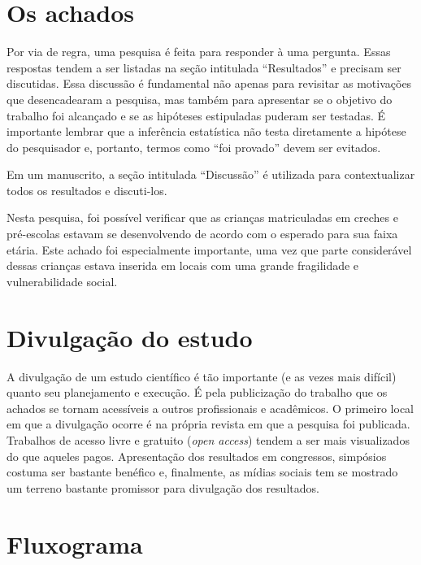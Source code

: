 \documentclass[
]{book}
\begin{document}
\hypertarget{os-achados}{%
\section{Os achados}\label{os-achados}}

Por via de regra, uma pesquisa é feita para responder à uma pergunta. Essas respostas tendem a ser listadas na seção intitulada ``Resultados'' e precisam ser discutidas. Essa discussão é fundamental não apenas para revisitar as motivações que desencadearam a pesquisa, mas também para apresentar se o objetivo do trabalho foi alcançado e se as hipóteses estipuladas puderam ser testadas. É importante lembrar que a inferência estatística não testa diretamente a hipótese do pesquisador e, portanto, termos como ``foi provado'' devem ser evitados.

Em um manuscrito, a seção intitulada ``Discussão'' é utilizada para contextualizar todos os resultados e discuti-los.

Nesta pesquisa, foi possível verificar que as crianças matriculadas em creches e pré-escolas estavam se desenvolvendo de acordo com o esperado para sua faixa etária. Este achado foi especialmente importante, uma vez que parte considerável dessas crianças estava inserida em locais com uma grande fragilidade e vulnerabilidade social.

\hypertarget{divulgauxe7uxe3o-do-estudo}{%
\section{Divulgação do estudo}\label{divulgauxe7uxe3o-do-estudo}}

A divulgação de um estudo científico é tão importante (e as vezes mais difícil) quanto seu planejamento e execução. É pela publicização do trabalho que os achados se tornam acessíveis a outros profissionais e acadêmicos. O primeiro local em que a divulgação ocorre é na própria revista em que a pesquisa foi publicada. Trabalhos de acesso livre e gratuito (\emph{open access}) tendem a ser mais visualizados do que aqueles pagos. Apresentação dos resultados em congressos, simpósios costuma ser bastante benéfico e, finalmente, as mídias sociais tem se mostrado um terreno bastante promissor para divulgação dos resultados.

\hypertarget{fluxograma}{%
\section{Fluxograma}\label{fluxograma}}
\end{document}
